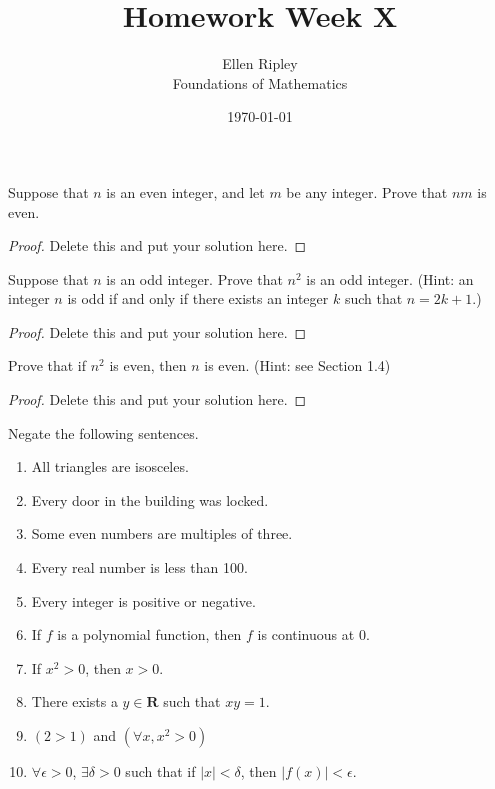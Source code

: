 \documentclass[12pt]{article}
\newenvironment{problem}[2][Problem]{\begin{trivlist}
\item[\hskip \labelsep {\bfseries #1}\hskip \labelsep {\bfseries #2.}]}{\end{trivlist}}
\begin{document}
 
 
\title{Homework Week X}%
\author{Ellen Ripley\\ %
Foundations of Mathematics} 
\date{\today} %
 
\maketitle

\begin{problem}{1}
Suppose that $n$ is an even integer, and let $m$ be any integer. Prove that $nm$ is even. 
\end{problem}
 
\begin{proof}
Delete this and put your solution here.
\end{proof}

\begin{problem}{2}
Suppose that $n$ is an odd integer. Prove that $n^2$ is an odd integer. (Hint: an integer $n$ is odd if and only if there exists an integer $k$ such that $n = 2k+1$.)
\end{problem}
 
\begin{proof}
Delete this and put your solution here.
\end{proof}
 
\begin{problem}{3}
Prove that if $n^2$ is even, then $n$ is even. (Hint: see Section 1.4)
\end{problem}
 
\begin{proof}
Delete this and put your solution here.
\end{proof} 
 
\begin{problem}{4}
Negate the following sentences.
\end{problem}

  \begin{enumerate}
\item All triangles are isosceles. 
\item Every door in the building was locked.
\item Some even numbers are multiples of three.
\item Every real number is less than 100.
\item Every integer is positive or negative.
\item If $f$ is a polynomial function, then $f$ is continuous at $0$.
\item If $x^2 > 0$, then $x > 0$.
\item There exists a $y \in \mathbf{R}$ such that $xy = 1$.
\item $(2 > 1)$ and $(\forall x, x^2 > 0)$
\item $\forall \epsilon > 0$, $\exists \delta > 0$ such that if $|x| < \delta$, then $|f(x)| < \epsilon$.
\end{enumerate}
\end{document}
